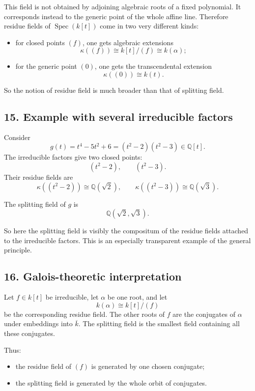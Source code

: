 \documentclass[12pt,a4paper]{article}
\theoremstyle{plain}
\theoremstyle{definition}      %
\begin{document}
This field is not obtained by adjoining algebraic roots of a fixed polynomial. It corresponds instead to the generic point of the whole affine line. Therefore residue fields of \(\operatorname{Spec}(k[t])\) come in two very different kinds:

\begin{itemize}
	\item for closed points \((f)\), one gets algebraic extensions
	\[
	\kappa((f))\cong k[t]/(f)\cong k(\alpha);
	\]
	\item for the generic point \((0)\), one gets the transcendental extension
	\[
	\kappa((0))\cong k(t).
	\]
\end{itemize}

So the notion of residue field is much broader than that of splitting field.

\subsection*{15. Example with several irreducible factors}

Consider
\[
g(t)=t^4-5t^2+6=(t^2-2)(t^2-3)\in \mathbb Q[t].
\]
The irreducible factors give two closed points:
\[
(t^2-2),\qquad (t^2-3).
\]
Their residue fields are
\[
\kappa((t^2-2))\cong \mathbb Q(\sqrt2),
\qquad
\kappa((t^2-3))\cong \mathbb Q(\sqrt3).
\]

The splitting field of \(g\) is
\[
\mathbb Q(\sqrt2,\sqrt3).
\]

So here the splitting field is visibly the compositum of the residue fields attached to the irreducible factors. This is an especially transparent example of the general principle.

\subsection*{16. Galois-theoretic interpretation}

Let \(f\in k[t]\) be irreducible, let \(\alpha\) be one root, and let
\[
k(\alpha)\cong k[t]/(f)
\]
be the corresponding residue field. The other roots of \(f\) are the conjugates of \(\alpha\) under embeddings into \(\overline{k}\). The splitting field is the smallest field containing all these conjugates.

Thus:
\begin{itemize}
	\item the residue field of \((f)\) is generated by one chosen conjugate;
	\item the splitting field is generated by the whole orbit of conjugates.
\end{itemize}
\end{document}
